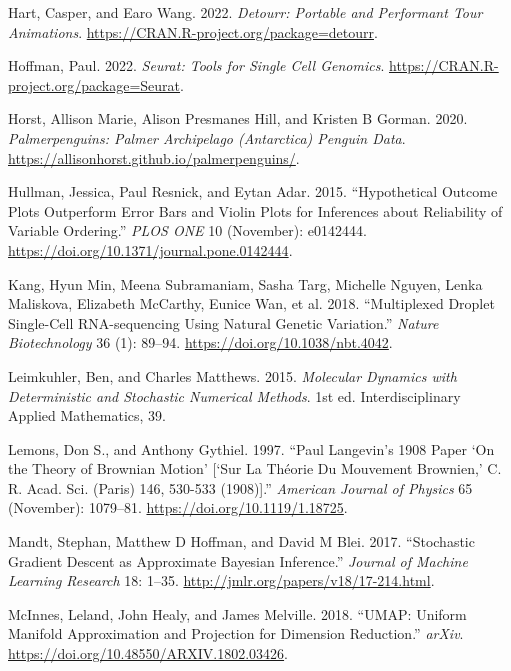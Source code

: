 \begin{CSLReferences}{1}{0}
\leavevmode{}%
Hart, Casper, and Earo Wang. 2022. \emph{Detourr: Portable and Performant Tour Animations}. \url{https://CRAN.R-project.org/package=detourr}.

\leavevmode{}%
Hoffman, Paul. 2022. \emph{{Seurat}: Tools for Single Cell Genomics}. \url{https://CRAN.R-project.org/package=Seurat}.

\leavevmode{}%
Horst, Allison Marie, Alison Presmanes Hill, and Kristen B Gorman. 2020. \emph{Palmerpenguins: {Palmer Archipelago (Antarctica)} Penguin Data}. \url{https://allisonhorst.github.io/palmerpenguins/}.

\leavevmode{}%
Hullman, Jessica, Paul Resnick, and Eytan Adar. 2015. {``{Hypothetical} {Outcome} {Plots} Outperform Error Bars and Violin Plots for Inferences about Reliability of Variable Ordering.''} \emph{PLOS ONE} 10 (November): e0142444. \url{https://doi.org/10.1371/journal.pone.0142444}.

\leavevmode{}%
Kang, Hyun Min, Meena Subramaniam, Sasha Targ, Michelle Nguyen, Lenka Maliskova, Elizabeth McCarthy, Eunice Wan, et al. 2018. {``Multiplexed Droplet Single-Cell {RNA-sequencing} Using Natural Genetic Variation.''} \emph{Nature Biotechnology} 36 (1): 89--94. \url{https://doi.org/10.1038/nbt.4042}.

\leavevmode{}%
Leimkuhler, Ben, and Charles Matthews. 2015. \emph{Molecular Dynamics with Deterministic and Stochastic Numerical Methods}. 1st ed. Interdisciplinary Applied Mathematics, 39.

\leavevmode{}%
Lemons, Don S., and Anthony Gythiel. 1997. {``{Paul Langevin}'s 1908 Paper {{`On the Theory of Brownian Motion'} {[}{`Sur La Théorie Du Mouvement Brownien,'} C. R. Acad. Sci. (Paris) 146, 530-533 (1908){]}}.''} \emph{American Journal of Physics} 65 (November): 1079--81. \url{https://doi.org/10.1119/1.18725}.

\leavevmode{}%
Mandt, Stephan, Matthew D Hoffman, and David M Blei. 2017. {``{Stochastic Gradient Descent} as {Approximate Bayesian Inference}.''} \emph{Journal of Machine Learning Research} 18: 1--35. \url{http://jmlr.org/papers/v18/17-214.html}.

\leavevmode{}%
McInnes, Leland, John Healy, and James Melville. 2018. {``{UMAP: Uniform Manifold Approximation and Projection} for Dimension Reduction.''} \emph{arXiv}. \url{https://doi.org/10.48550/ARXIV.1802.03426}.


\end{CSLReferences}

